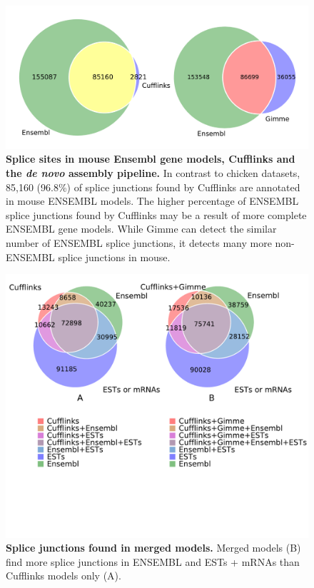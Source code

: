\documentclass[10pt]{article}
\begin{document}
\begin{figure}[!ht]
\begin{center}
\includegraphics[width=5in]{mouse_venn.pdf}
\end{center}
\caption{
{\bf Splice sites in mouse Ensembl gene models, Cufflinks and the \emph{de
novo} assembly pipeline.} In contrast to chicken datasets, 85,160 (96.8\%) of
splice junctions found by Cufflinks are annotated in mouse ENSEMBL models. The
higher percentage of ENSEMBL splice junctions found by Cufflinks may be a
result of more complete ENSEMBL gene models. While Gimme can detect the similar
number of ENSEMBL splice junctions, it detects many more non-ENSEMBL splice
junctions in mouse.}
\label{mus_venn}
\end{figure}


\begin{figure}[!ht]
\begin{center}
\includegraphics[width=5in]{cuff_gimme_junctions_venn.pdf}
\end{center}
\caption{
    {\bf Splice junctions found in merged models.} Merged models (B) find more
    splice junctions in ENSEMBL and ESTs + mRNAs than Cufflinks models only (A).
}
\label{combined_venn}
\end{figure}
\end{document}
